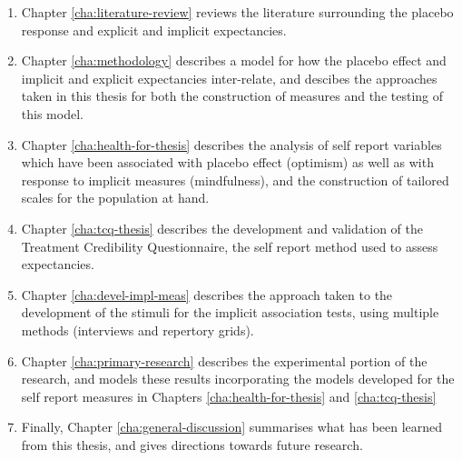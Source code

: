 \begin{enumerate}
\item Chapter \ref{cha:literature-review} reviews the literature surrounding the placebo response and explicit and implicit expectancies. 

\item Chapter \ref{cha:methodology} describes a model for how the placebo effect and implicit and explicit expectancies inter-relate, and descibes the approaches taken in this thesis for both the construction of measures and the testing of this model. 


\item Chapter \ref{cha:health-for-thesis} describes the analysis of self report variables which have been associated with placebo effect (optimism) as well as with response to implicit measures (mindfulness), and the construction of tailored scales for the population at hand. 

\item Chapter \ref{cha:tcq-thesis} describes the development and validation of the Treatment Credibility Questionnaire, the self report method used to assess expectancies.

\item Chapter \ref{cha:devel-impl-meas} describes the approach taken to the development of the stimuli for the implicit association tests, using multiple methods (interviews and repertory grids).

\item Chapter \ref{cha:primary-research} describes the experimental portion of the research, and models these results incorporating the models developed for the self report measures in Chapters \ref{cha:health-for-thesis} and \ref{cha:tcq-thesis}

\item Finally, Chapter \ref{cha:general-discussion} summarises what has been learned from this thesis, and gives directions towards future research.

\end{enumerate}




